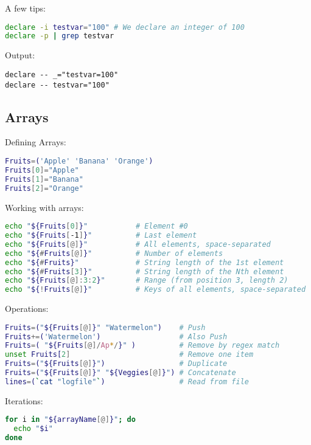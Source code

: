 \documentclass{article}
\begin{document}
A few tips:

\begin{lstlisting}[style=command, language=bash]
declare -i testvar="100" # We declare an integer of 100
declare -p | grep testvar
\end{lstlisting}

Output:
\begin{lstlisting}[style=terminal]
declare -- _="testvar=100"
declare -- testvar="100"
\end{lstlisting}

\subsection{Arrays}
Defining Arrays:
\begin{lstlisting}[style=command, language=bash]
Fruits=('Apple' 'Banana' 'Orange')
Fruits[0]="Apple"
Fruits[1]="Banana"
Fruits[2]="Orange"
\end{lstlisting}

Working with arrays:

\begin{lstlisting}[style=command, language=bash]
echo "${Fruits[0]}"           # Element #0
echo "${Fruits[-1]}"          # Last element
echo "${Fruits[@]}"           # All elements, space-separated
echo "${#Fruits[@]}"          # Number of elements
echo "${#Fruits}"             # String length of the 1st element
echo "${#Fruits[3]}"          # String length of the Nth element
echo "${Fruits[@]:3:2}"       # Range (from position 3, length 2)
echo "${!Fruits[@]}"          # Keys of all elements, space-separated
\end{lstlisting}

Operations:
\begin{lstlisting}[style=command, language=bash]
Fruits=("${Fruits[@]}" "Watermelon")    # Push
Fruits+=('Watermelon')                  # Also Push
Fruits=( "${Fruits[@]/Ap*/}" )          # Remove by regex match
unset Fruits[2]                         # Remove one item
Fruits=("${Fruits[@]}")                 # Duplicate
Fruits=("${Fruits[@]}" "${Veggies[@]}") # Concatenate
lines=(`cat "logfile"`)                 # Read from file
\end{lstlisting}

Iterations:
\begin{lstlisting}[style=command, language=bash]
for i in "${arrayName[@]}"; do
  echo "$i"
done
\end{lstlisting}

\pagebreak
\end{document}
